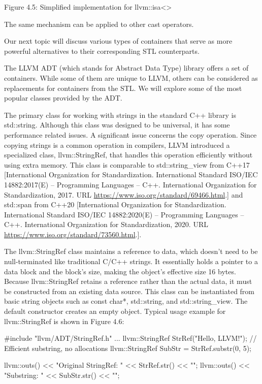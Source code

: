 \begin{center}
Figure 4.5: Simplified implementation for llvm::isa<>
\end{center}

The same mechanism can be applied to other cast operators.

Our next topic will discuss various types of containers that serve as more powerful alternatives to their corresponding STL counterparts.


The LLVM ADT (which stands for Abstract Data Type) library offers a set of containers. While some of them are unique to LLVM, others can be considered as replacements for containers from the STL. We will explore some of the most popular classes provided by the ADT.


The primary class for working with strings in the standard C++ library is std::string. Although this class was designed to be universal, it has some performance related issues. A significant issue concerns the copy operation. Since copying strings is a common operation in compilers, LLVM introduced a specialized class, llvm::StringRef, that handles this operation efficiently without using extra memory. This class is comparable to std::string\_view from C++17 [International Organization for Standardization. International Standard ISO/IEC 14882:2017(E) – Programming Languages – C++. International Organization for Standardization, 2017. URL \url{https://www.iso.org/standard/69466.html}.] and std::span from C++20 [International Organization for Standardization. International Standard ISO/IEC 14882:2020(E) – Programming Languages – C++. International Organization for Standardization, 2020. URL \url{https://www.iso.org/standard/73560.html}.].

The llvm::StringRef class maintains a reference to data, which doesn't need to be null-terminated like traditional C/C++ strings. It essentially holds a pointer to a data block and the block's size, making the object's effective size 16 bytes. Because llvm::StringRef retains a reference rather than the actual data, it must be constructed from an existing data source. This class can be instantiated from basic string objects such as const char*, std::string, and std::string\_view. The default constructor creates an empty object. Typical usage example for llvm::StringRef is shown in Figure 4.6:

\begin{cpp}
#include "llvm/ADT/StringRef.h"
...
llvm::StringRef StrRef("Hello, LLVM!");
// Efficient substring, no allocations
llvm::StringRef SubStr = StrRef.substr(0, 5);

llvm::outs() << "Original StringRef: " << StrRef.str() << "\n";
llvm::outs() << "Substring: " << SubStr.str() << "\n";
\end{cpp}

